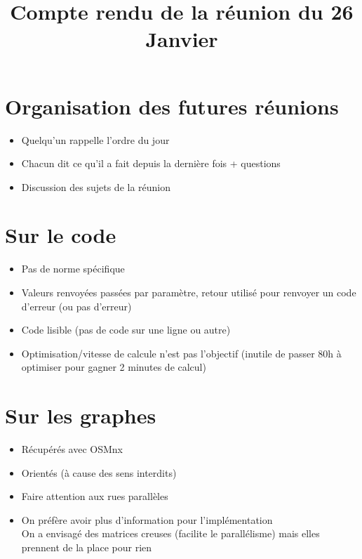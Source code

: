 \documentclass{article}
\title{Compte rendu de la réunion du 26 Janvier}
\date{}
\begin{document}
\maketitle

\section*{Organisation des futures réunions}
\begin{itemize}
	\item Quelqu'un rappelle l'ordre du jour
	\item Chacun dit ce qu'il a fait depuis la dernière fois + questions
	\item Discussion des sujets de la réunion
\end{itemize}

\section*{Sur le code}
\begin{itemize}
	\item Pas de norme spécifique
	\item Valeurs renvoyées passées par paramètre, retour utilisé pour renvoyer un code d'erreur (ou pas d'erreur)
	\item Code lisible (pas de code sur une ligne ou autre)
	\item Optimisation/vitesse de calcule n'est pas l'objectif (inutile de passer 80h à optimiser pour gagner 2 minutes de calcul)
\end{itemize}

\section*{Sur les graphes}
\begin{itemize}
	\item Récupérés avec OSMnx
	\item Orientés (à cause des sens interdits)
	\item Faire attention aux rues parallèles
	\item On préfère avoir plus d'information pour l'implémentation \\
	On a envisagé des matrices creuses (facilite le parallélisme) mais elles prennent de la place pour rien
\end{itemize}
\end{document}
